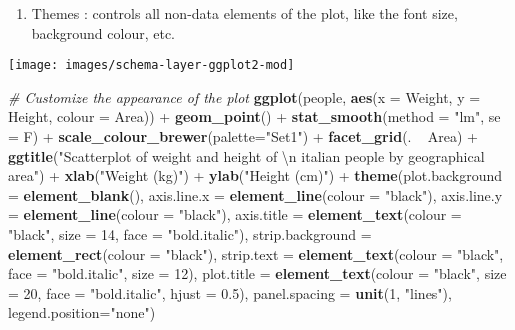 \documentclass[]{book}
\newenvironment{Shaded}{\begin{snugshade}}{\end{snugshade}}
\newcommand{\KeywordTok}[1]{\textcolor[rgb]{0.13,0.29,0.53}{\textbf{{#1}}}}
\newcommand{\DataTypeTok}[1]{\textcolor[rgb]{0.13,0.29,0.53}{{#1}}}
\newcommand{\DecValTok}[1]{\textcolor[rgb]{0.00,0.00,0.81}{{#1}}}
\newcommand{\FloatTok}[1]{\textcolor[rgb]{0.00,0.00,0.81}{{#1}}}
\newcommand{\CharTok}[1]{\textcolor[rgb]{0.31,0.60,0.02}{{#1}}}
\newcommand{\StringTok}[1]{\textcolor[rgb]{0.31,0.60,0.02}{{#1}}}
\newcommand{\CommentTok}[1]{\textcolor[rgb]{0.56,0.35,0.01}{\textit{{#1}}}}
\newcommand{\NormalTok}[1]{{#1}}
\providecommand{\tightlist}{%
  \setlength{\itemsep}{0pt}\setlength{\parskip}{0pt}}
\def\tightlist{}
\begin{document}
\begin{enumerate}
\def\labelenumi{\arabic{enumi}.}
\setcounter{enumi}{5}
\tightlist
\item
   {Themes} : controls all non-data elements of the plot, like the font
  size, background colour, etc.
\end{enumerate}

\texttt{[image: images/schema-layer-ggplot2-mod]}

\begin{Shaded}
\begin{Highlighting}[]
\CommentTok{# Customize the appearance of the plot}
\KeywordTok{ggplot}\NormalTok{(people, }\KeywordTok{aes}\NormalTok{(}\DataTypeTok{x =} \NormalTok{Weight, }\DataTypeTok{y =} \NormalTok{Height, }\DataTypeTok{colour =} \NormalTok{Area)) +}
\StringTok{  }\KeywordTok{geom_point}\NormalTok{() +}
\StringTok{  }\KeywordTok{stat_smooth}\NormalTok{(}\DataTypeTok{method =} \StringTok{"lm"}\NormalTok{, }\DataTypeTok{se =} \NormalTok{F) +}
\StringTok{  }\KeywordTok{scale_colour_brewer}\NormalTok{(}\DataTypeTok{palette=}\StringTok{"Set1"}\NormalTok{) +}
\StringTok{  }\KeywordTok{facet_grid}\NormalTok{(. ~}\StringTok{ }\NormalTok{Area) +}
\StringTok{  }\KeywordTok{ggtitle}\NormalTok{(}\StringTok{"Scatterplot of weight and height of }\CharTok{\textbackslash{}n}\StringTok{ italian people by geographical area"}\NormalTok{) +}\StringTok{ }
\StringTok{    }\KeywordTok{xlab}\NormalTok{(}\StringTok{"Weight (kg)"}\NormalTok{) +}
\StringTok{    }\KeywordTok{ylab}\NormalTok{(}\StringTok{"Height (cm)"}\NormalTok{) +}
\StringTok{  }\KeywordTok{theme}\NormalTok{(}\DataTypeTok{plot.background =} \KeywordTok{element_blank}\NormalTok{(),}
    \DataTypeTok{axis.line.x =} \KeywordTok{element_line}\NormalTok{(}\DataTypeTok{colour =} \StringTok{"black"}\NormalTok{),}
    \DataTypeTok{axis.line.y =} \KeywordTok{element_line}\NormalTok{(}\DataTypeTok{colour =} \StringTok{"black"}\NormalTok{),}
    \DataTypeTok{axis.title =} \KeywordTok{element_text}\NormalTok{(}\DataTypeTok{colour =} \StringTok{"black"}\NormalTok{, }\DataTypeTok{size =} \DecValTok{14}\NormalTok{, }\DataTypeTok{face =} \StringTok{"bold.italic"}\NormalTok{),}
    \DataTypeTok{strip.background =} \KeywordTok{element_rect}\NormalTok{(}\DataTypeTok{colour =} \StringTok{"black"}\NormalTok{),}
    \DataTypeTok{strip.text =} \KeywordTok{element_text}\NormalTok{(}\DataTypeTok{colour =} \StringTok{"black"}\NormalTok{, }\DataTypeTok{face =} \StringTok{"bold.italic"}\NormalTok{, }\DataTypeTok{size =} \DecValTok{12}\NormalTok{),}
    \DataTypeTok{plot.title =} \KeywordTok{element_text}\NormalTok{(}\DataTypeTok{colour =} \StringTok{"black"}\NormalTok{, }\DataTypeTok{size =} \DecValTok{20}\NormalTok{, }\DataTypeTok{face =} \StringTok{"bold.italic"}\NormalTok{, }\DataTypeTok{hjust =} \FloatTok{0.5}\NormalTok{),}
    \DataTypeTok{panel.spacing =} \KeywordTok{unit}\NormalTok{(}\DecValTok{1}\NormalTok{, }\StringTok{"lines"}\NormalTok{),}
    \DataTypeTok{legend.position=}\StringTok{"none"}\NormalTok{)}
\end{Highlighting}
\end{Shaded}
\end{document}

